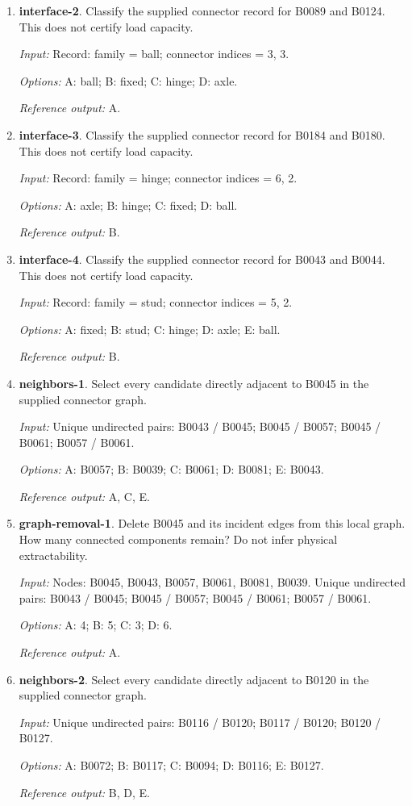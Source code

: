 \begin{enumerate}
\item \textbf{interface-2}. Classify the supplied connector record for B0089 and B0124. This does not certify load capacity.\par {\small \textit{Input:} Record: family = ball; connector indices = 3, 3. \par\textit{Options:} A: ball; B: fixed; C: hinge; D: axle. \par\textit{Reference output:} A.}
\item \textbf{interface-3}. Classify the supplied connector record for B0184 and B0180. This does not certify load capacity.\par {\small \textit{Input:} Record: family = hinge; connector indices = 6, 2. \par\textit{Options:} A: axle; B: hinge; C: fixed; D: ball. \par\textit{Reference output:} B.}
\item \textbf{interface-4}. Classify the supplied connector record for B0043 and B0044. This does not certify load capacity.\par {\small \textit{Input:} Record: family = stud; connector indices = 5, 2. \par\textit{Options:} A: fixed; B: stud; C: hinge; D: axle; E: ball. \par\textit{Reference output:} B.}
\item \textbf{neighbors-1}. Select every candidate directly adjacent to B0045 in the supplied connector graph.\par {\small \textit{Input:} Unique undirected pairs: B0043 / B0045; B0045 / B0057; B0045 / B0061; B0057 / B0061. \par\textit{Options:} A: B0057; B: B0039; C: B0061; D: B0081; E: B0043. \par\textit{Reference output:} A, C, E.}
\item \textbf{graph-removal-1}. Delete B0045 and its incident edges from this local graph. How many connected components remain? Do not infer physical extractability.\par {\small \textit{Input:} Nodes: B0045, B0043, B0057, B0061, B0081, B0039. Unique undirected pairs: B0043 / B0045; B0045 / B0057; B0045 / B0061; B0057 / B0061. \par\textit{Options:} A: 4; B: 5; C: 3; D: 6. \par\textit{Reference output:} A.}
\item \textbf{neighbors-2}. Select every candidate directly adjacent to B0120 in the supplied connector graph.\par {\small \textit{Input:} Unique undirected pairs: B0116 / B0120; B0117 / B0120; B0120 / B0127. \par\textit{Options:} A: B0072; B: B0117; C: B0094; D: B0116; E: B0127. \par\textit{Reference output:} B, D, E.}

\end{enumerate}
